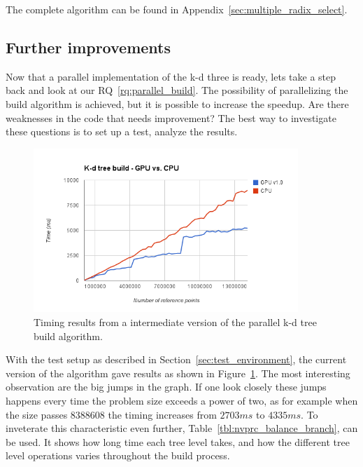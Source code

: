 The  complete algorithm can be found in Appendix~\ref{sec:multiple_radix_select}.







\subsection{Further improvements} %
\label{ssub:further_development}


Now that a parallel implementation of the k-d three is ready, lets take a step back and look at our RQ~\ref{rq:parallel_build}. The possibility of parallelizing the build algorithm is achieved, but it is possible to increase the speedup. Are there weaknesses in the code that needs improvement? The best way to investigate these questions is to set up a test, analyze the results.

\begin{figure}[ht!]
\centering
\includegraphics[width=100mm]{../gfx/the_jumps.png}

\caption{Timing results from a intermediate version of the parallel k-d tree build algorithm.}
\label{fig:gpuv1_vs_cpu}
\end{figure}


With the test setup as described in Section~\ref{sec:test_environment}, the current version of the algorithm gave results as shown in Figure~\ref{fig:gpuv1_vs_cpu}. The most interesting observation are the big jumps in the graph. If one look closely these jumps happens every time the problem size exceeds a power of two, as for example when the size passes $8388608$ the timing increases from $2703 ms$ to $4335 ms$. To inveterate this characteristic even further, Table~\ref{tbl:nvprc_balance_branch}, can be used. It shows how long time each tree level takes, and how the different tree level operations varies throughout the build process.

